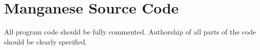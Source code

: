 %
%

\chapter{Manganese Source Code}\label{app:code}
All program code should be fully commented. Authorship
of all parts of the code should be clearly specified.

